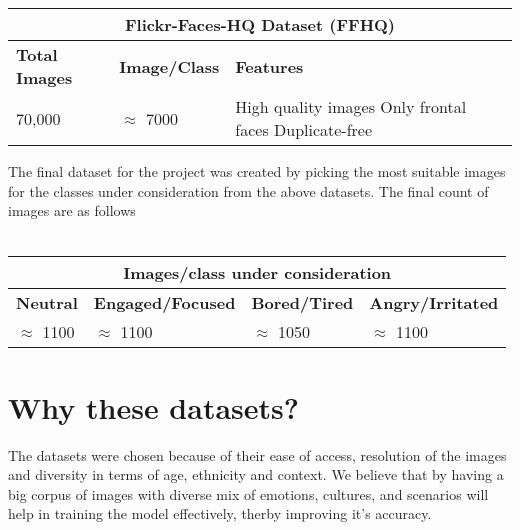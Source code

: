    \begin{tabular}{ |p{3cm}||p{3cm} ||p{3cm} | }
        \hline
        \multicolumn{3}{|c|}{\textbf{Flickr-Faces-HQ Dataset (FFHQ)}} \\
        \hline
        \textbf{Total Images} & \textbf{Image/Class } & \textbf{Features}\\
        \hline
        70,000 & $\approx$ 7000 & High quality images Only frontal faces Duplicate-free\\
        \hline
    \end{tabular}
    \vspace*{2em}

    \noindent The final dataset\cite{6721Dataset} for the project was created by picking the most suitable images for the classes under consideration from the above datasets. The final count of images are as follows\\\\
        \begin{tabular}{ |p{3cm}||p{3cm} ||p{3cm} ||p{3cm} | }
            \hline
            \multicolumn{4}{|c|}{\textbf{Images/class under consideration}} \\
            \hline
            \textbf{Neutral} & \textbf{Engaged/Focused} & \textbf{Bored/Tired} & \textbf{Angry/Irritated} \\
            \hline
            $\approx$ 1100 & $\approx$ 1100 & $\approx$ 1050 & $\approx$ 1100\\
            \hline
        \end{tabular}
    \vspace*{1em}
\section{Why these datasets?}
\noindent The datasets were chosen because of their ease of access, resolution of the images and diversity in terms of age, ethnicity and context. We believe that by having a big corpus of images with diverse mix of emotions, cultures, and scenarios will help in training the model effectively, therby improving it's accuracy. \\
